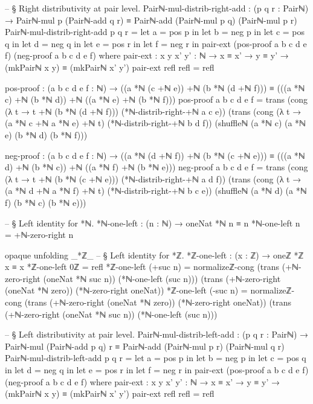 \documentclass[11pt,a4paper]{book}
\begin{document}
\begin{code}
-- § Right distributivity at pair level.
Pairℕ-mul-distrib-right-add : (p q r : Pairℕ) →
  Pairℕ-mul p (Pairℕ-add q r) ≡ Pairℕ-add (Pairℕ-mul p q) (Pairℕ-mul p r)
Pairℕ-mul-distrib-right-add p q r =
  let a = pos p in
  let b = neg p in
  let c = pos q in
  let d = neg q in
  let e = pos r in
  let f = neg r in
  pair-ext
    (pos-proof a b c d e f)
    (neg-proof a b c d e f)
  where
    pair-ext : {x y x' y' : ℕ} → x ≡ x' → y ≡ y' → (mkPairℕ x y) ≡ (mkPairℕ x' y')
    pair-ext refl refl = refl

    pos-proof : (a b c d e f : ℕ) →
      ((a *ℕ (c +ℕ e)) +ℕ (b *ℕ (d +ℕ f)))
        ≡
      (((a *ℕ c) +ℕ (b *ℕ d)) +ℕ ((a *ℕ e) +ℕ (b *ℕ f)))
    pos-proof a b c d e f =
      trans
        (cong (λ t → t +ℕ (b *ℕ (d +ℕ f))) (*ℕ-distrib-right-+ℕ a c e))
        (trans
          (cong (λ t → (a *ℕ c +ℕ a *ℕ e) +ℕ t) (*ℕ-distrib-right-+ℕ b d f))
          (shuffleℕ (a *ℕ c) (a *ℕ e) (b *ℕ d) (b *ℕ f)))

    neg-proof : (a b c d e f : ℕ) →
      ((a *ℕ (d +ℕ f)) +ℕ (b *ℕ (c +ℕ e)))
        ≡
      (((a *ℕ d) +ℕ (b *ℕ c)) +ℕ ((a *ℕ f) +ℕ (b *ℕ e)))
    neg-proof a b c d e f =
      trans
        (cong (λ t → t +ℕ (b *ℕ (c +ℕ e))) (*ℕ-distrib-right-+ℕ a d f))
        (trans
          (cong (λ t → (a *ℕ d +ℕ a *ℕ f) +ℕ t) (*ℕ-distrib-right-+ℕ b c e))
          (shuffleℕ (a *ℕ d) (a *ℕ f) (b *ℕ c) (b *ℕ e)))

-- § Left identity for *ℕ.
*ℕ-one-left : (n : ℕ) → oneNat *ℕ n ≡ n
*ℕ-one-left n = +ℕ-zero-right n

opaque
  unfolding _*ℤ_
  -- § Left identity for *ℤ.
  *ℤ-one-left : (x : ℤ) → oneℤ *ℤ x ≡ x
  *ℤ-one-left 0ℤ = refl
  *ℤ-one-left (+suc n) =
    normalizeℤ-cong
      (trans
        (+ℕ-zero-right (oneNat *ℕ suc n))
        (*ℕ-one-left (suc n)))
      (trans
        (+ℕ-zero-right (oneNat *ℕ zero))
        (*ℕ-zero-right oneNat))
  *ℤ-one-left (-suc n) =
    normalizeℤ-cong
      (trans
        (+ℕ-zero-right (oneNat *ℕ zero))
        (*ℕ-zero-right oneNat))
      (trans
        (+ℕ-zero-right (oneNat *ℕ suc n))
        (*ℕ-one-left (suc n)))

-- § Left distributivity at pair level.
Pairℕ-mul-distrib-left-add : (p q r : Pairℕ) →
  Pairℕ-mul (Pairℕ-add p q) r ≡ Pairℕ-add (Pairℕ-mul p r) (Pairℕ-mul q r)
Pairℕ-mul-distrib-left-add p q r =
  let a = pos p in
  let b = neg p in
  let c = pos q in
  let d = neg q in
  let e = pos r in
  let f = neg r in
  pair-ext
    (pos-proof a b c d e f)
    (neg-proof a b c d e f)
  where
    pair-ext : {x y x' y' : ℕ} → x ≡ x' → y ≡ y' → (mkPairℕ x y) ≡ (mkPairℕ x' y')
    pair-ext refl refl = refl


\end{code}
\end{document}
